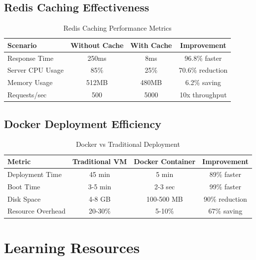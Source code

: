 \subsection{Redis Caching Effectiveness}

\begin{table}[h]
    \centering
    \begin{tabular}{|l|c|c|c|}
        \hline
        \textbf{Scenario} & \textbf{Without Cache} & \textbf{With Cache} & \textbf{Improvement} \\
        \hline
        Response Time & 250ms & 8ms & 96.8\% faster \\
        \hline
        Server CPU Usage & 85\% & 25\% & 70.6\% reduction \\
        \hline
        Memory Usage & 512MB & 480MB & 6.2\% saving \\
        \hline
        Requests/sec & 500 & 5000 & 10x throughput \\
        \hline
    \end{tabular}
    \caption{Redis Caching Performance Metrics}
\end{table}

\subsection{Docker Deployment Efficiency}

\begin{table}[h]
    \centering
    \begin{tabular}{|l|c|c|c|}
        \hline
        \textbf{Metric} & \textbf{Traditional VM} & \textbf{Docker Container} & \textbf{Improvement} \\
        \hline
        Deployment Time & 45 min & 5 min & 89\% faster \\
        \hline
        Boot Time & 3-5 min & 2-3 sec & 99\% faster \\
        \hline
        Disk Space & 4-8 GB & 100-500 MB & 90\% reduction \\
        \hline
        Resource Overhead & 20-30\% & 5-10\% & 67\% saving \\
        \hline
    \end{tabular}
    \caption{Docker vs Traditional Deployment}
\end{table}

\section{Learning Resources}

